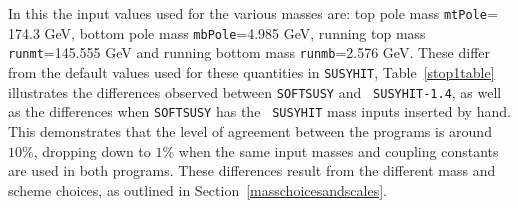 \documentclass[final,3p,times]{elsarticle}
\def\code#1{{\tt #1}}
\begin{document}
In this the input values used for the various masses are: top pole mass \code{mtPole}=
174.3 GeV, bottom pole mass \code{mbPole}=4.985 GeV, running top mass 
\code{runmt}=145.555 GeV and running bottom mass \code{runmb}=2.576 GeV. These
differ from the default values used for these quantities in {\tt SUSYHIT},
Table~\ref{stop1table} 
illustrates the differences observed between {\tt SOFTSUSY} and {\tt
  SUSYHIT-1.4}, as well as the differences when {\tt SOFTSUSY} has the {\tt
  SUSYHIT} mass inputs inserted by hand. This demonstrates that the level of
agreement between the programs is around $10\%$, dropping down to $1\%$ when
the same input masses and coupling constants are used in both programs. These
differences result from the different mass and scheme choices,
as outlined in Section~\ref{masschoicesandscales}. 
\end{document}

